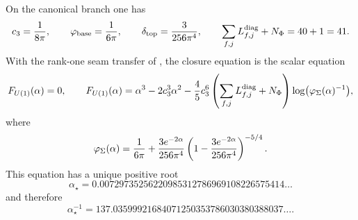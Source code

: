 \begin{theorem}
\label{thm:exact-electromagnetic-closure}
\label{thm:alpha-canonical}
On the canonical branch one has
\[
c_3=\frac{1}{8\pi},
\qquad
\varphi_{\mathrm{base}}=\frac{1}{6\pi},
\qquad
\delta_{\mathrm{top}}=\frac{3}{256\pi^4},
\qquad
\sum_{f,j}L_{f,j}^{\mathrm{diag}}+N_\Phi=40+1=41.
\]
With the rank-one seam transfer of , the closure equation
is the scalar equation
\begin{equation}
\label{eq:carrier-cfe}
F_{U(1)}(\alpha)=0,
\qquad
F_{U(1)}(\alpha)=\alpha^3-2c_3^3\alpha^2-\frac45c_3^6
\left(\sum_{f,j}L_{f,j}^{\mathrm{diag}}+N_\Phi\right)\log\bigl(\varphi_{\Sigma}(\alpha)^{-1}\bigr),
\end{equation}
where
\[
\varphi_{\Sigma}(\alpha)=\frac{1}{6\pi}+\frac{3e^{-2\alpha}}{256\pi^4}
\left(1-\frac{3e^{-2\alpha}}{256\pi^4}\right)^{-5/4}.
\]
This equation has a unique positive root
\[
\alpha_{\star}=0.00729735256220985312786969108226575414\dots
\]
and therefore
\[
\alpha_{\star}^{-1}=137.03599921684071250353786030380388037\dots.
\]
\end{theorem}

